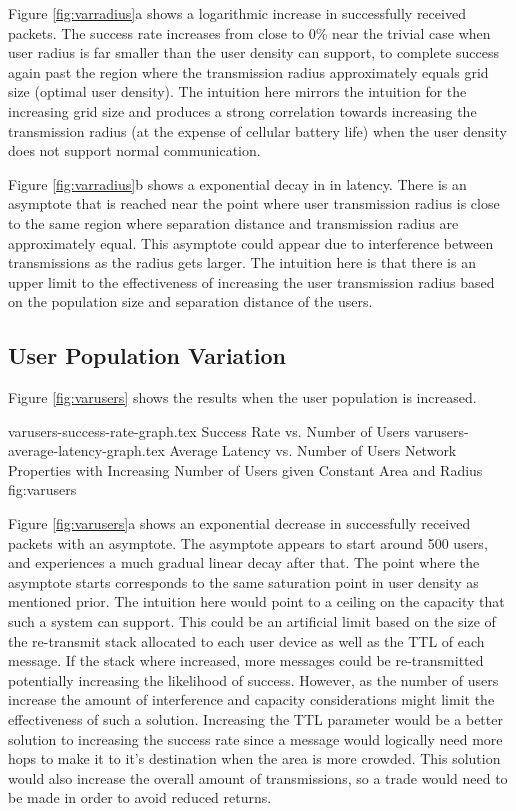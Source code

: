 Figure \ref{fig:varradius}a shows a logarithmic increase in successfully received packets.
The success rate increases from close to 0\% near the trivial case when user radius is far smaller
than the user density can support, to complete success again past the region where
the transmission radius approximately equals grid size (optimal user density).
The intuition here mirrors the intuition for the increasing grid size and produces a strong
correlation towards increasing the transmission radius (at the expense of cellular battery life)
when the user density does not support normal communication.

Figure \ref{fig:varradius}b shows a exponential decay in in latency.
There is an asymptote that is reached near the point where user transmission radius is
close to the same region where separation distance and transmission radius are approximately
equal. This asymptote could appear due to interference between transmissions as the radius 
gets larger. The intuition here is that there is an upper limit to the effectiveness of increasing
the user transmission radius based on the population size and separation distance of the users.

\subsection{User Population Variation}
Figure \ref{fig:varusers} shows the results when the user population is increased.

\sidebysidefigures
{varusers-success-rate-graph.tex}      {Success Rate vs. Number of Users}
{varusers-average-latency-graph.tex}   {Average Latency vs. Number of Users}
{Network Properties with Increasing Number of Users given Constant Area and Radius}
{fig:varusers}

Figure \ref{fig:varusers}a shows an exponential decrease in successfully received packets with
an asymptote. The asymptote appears to start around 500 users, and experiences a much gradual
linear decay after that. The point where the asymptote starts corresponds to the same saturation 
point in user density as mentioned prior. The intuition here would point to
a ceiling on the capacity that such a system can support. This could be an artificial limit based
on the size of the re-transmit stack allocated to each user device as well as the TTL of each message.
If the stack where increased, more messages could be re-transmitted potentially increasing the
likelihood of success. However, as the number of users increase the amount of interference and
capacity considerations might limit the effectiveness of such a solution. Increasing the TTL
parameter would be a better solution to increasing the success rate since a message would
logically need more hops to make it to it's destination when the area is more crowded.
This solution would also increase the overall amount of transmissions, so a trade would need to be
made in order to avoid reduced returns.

